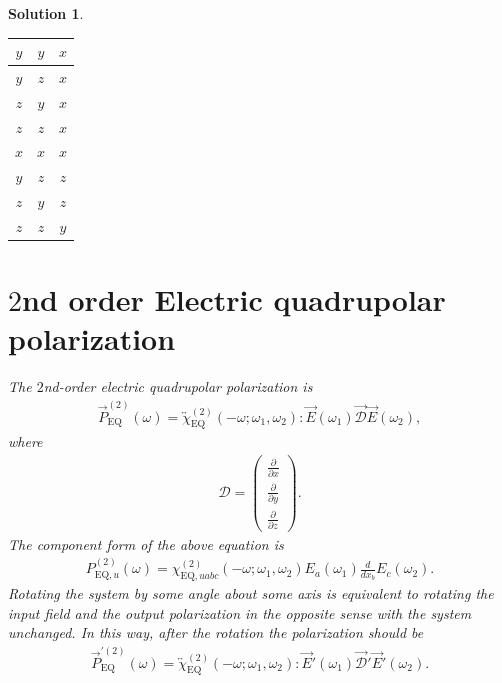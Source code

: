 \documentclass[UTF8,10pt,a4paper]{article}
\theoremstyle{Problem}
\theoremstyle{Solution}
\newtheorem*{sol}{Solution}
\begin{document}
\begin{sol}
\begin{table}[h]
\begin{tabular}{|c|c|c|}
        $y$ & $y$ & $x$ \\ \hline
        $y$ & $z$ & $x$ \\ \hline
        $z$ & $y$ & $x$ \\ \hline
        $z$ & $z$ & $x$ \\ \hline
        $x$ & $x$ & $x$ \\ \hline
        $y$ & $z$ & $z$ \\ \hline
        $z$ & $y$ & $z$ \\ \hline
        $z$ & $z$ & $y$ \\ \hline
        \end{tabular}
    \end{table}




    \section{$2$nd order Electric quadrupolar polarization}
    The $2$nd-order electric quadrupolar polarization is
    \begin{align}
        \vec{P}_{\text{EQ}}^{(2)}(\omega)=\overleftrightarrow{\chi}_{\text{EQ}}^{(2)}(-\omega;\omega_1,\omega_2):\vec{E}(\omega_1)\vec{\mathcal{D}}\vec{E}(\omega_2),
    \end{align}
    where
    \begin{align}
        \mathcal{D}=\left(\begin{matrix}
            \frac{\partial}{\partial x}\\
            \frac{\partial}{\partial y}\\
            \frac{\partial}{\partial z}
        \end{matrix}\right).
    \end{align}
    The component form of the above equation is
    \begin{align}
        P_{\text{EQ},u}^{(2)}(\omega)=\chi_{\text{EQ},uabc}^{(2)}(-\omega;\omega_1,\omega_2)E_a(\omega_1)\frac{d}{dx_b}E_c(\omega_2).
    \end{align}
    Rotating the system by some angle about some axis is equivalent to rotating the input field and the output polarization in the opposite sense with the system unchanged. In this way, after the rotation the polarization should be
    \begin{align}
        \vec{P}_{\text{EQ}}^{'(2)}(\omega)=\overleftrightarrow{\chi}_{\text{EQ}}^{(2)}(-\omega;\omega_1,\omega_2):\vec{E}'(\omega_1)\vec{\mathcal{D}}'\vec{E}'(\omega_2).
    \end{align}

\end{sol}
\end{document}
